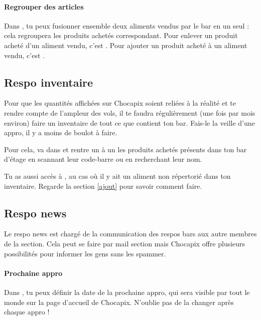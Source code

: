 \documentclass[12pt,french]{article}
\begin{document}
\paragraph{Regrouper des articles} Dans , tu peux fusionner ensemble deux aliments vendus par le bar en un seul : cela regroupera les produits achetés correspondant. Pour enlever un produit acheté d'un aliment vendu, c'est . Pour ajouter un produit acheté à un aliment vendu, c'est .

\subsection{Respo inventaire}

Pour que les quantités affichées sur Chocapix soient reliées à la réalité et te rendre compte de l'ampleur des vols, il te faudra régulièrement (une fois par mois environ) faire un inventaire de tout ce que contient ton bar. Fais-le la veille d'une appro, il y a moins de boulot à faire.

Pour cela, va dans  et rentre un à un les produits achetés présents dans ton bar d'étage en scannant leur code-barre ou en recherchant leur nom.

Tu as aussi accès à , au cas où il y ait un aliment non répertorié dans ton inventaire. Regarde la section \ref{ajout} pour savoir comment faire.

\subsection{Respo news}

Le respo news est chargé de la communication des respos bars aux autre membres de la section. Cela peut se faire par mail section mais Chocapix offre plusieurs possibilités pour informer les gens sans les spammer.

\paragraph{Prochaine appro} Dans , tu peux définir la date de la prochaine appro, qui sera visible par tout le monde sur la page d'accueil de Chocapix. N'oublie pas de la changer après chaque appro !
\end{document}

